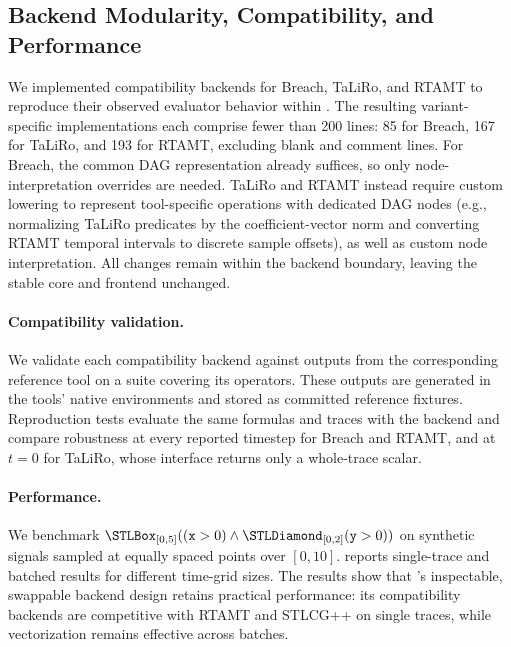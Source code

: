 \subsection{Backend Modularity, Compatibility, and Performance}
\label{sec:implement-variations}

We implemented compatibility backends for Breach, TaLiRo, and RTAMT to
reproduce their observed evaluator behavior within \tool.
The resulting variant-specific implementations each comprise fewer than 200
lines: 85 for Breach, 167 for TaLiRo, and 193 for RTAMT, excluding blank and
comment lines.
For Breach, the common DAG representation already suffices, so only
node-interpretation overrides are needed. TaLiRo and RTAMT instead require
custom lowering to represent tool-specific operations with dedicated DAG nodes
(e.g., normalizing TaLiRo predicates by the coefficient-vector norm and
converting RTAMT temporal intervals to discrete sample offsets), as well as
custom node interpretation. All changes remain within the backend boundary,
leaving the stable core and frontend unchanged.

\paragraph{Compatibility validation.}
We validate each compatibility backend against outputs from the corresponding
reference tool on a suite covering its operators. These outputs are generated
in the tools' native environments and stored as committed reference fixtures.
Reproduction tests evaluate the same formulas and traces with the backend and
compare robustness at every reported timestep for Breach and RTAMT, and at
$t=0$ for TaLiRo, whose interface returns only a whole-trace scalar.

\paragraph{Performance.}\label{sec:performance}
We benchmark
$\Always_{[0,5]}((\mathtt{x}>0)\wedge\Eventually_{[0,2]}(\mathtt{y}>0))$ on synthetic signals
sampled at equally spaced points over $[0,10]$.
 reports single-trace and batched results for
different time-grid sizes.
The results show that \tool's inspectable, swappable backend design retains
practical performance: its compatibility backends are competitive with RTAMT
and STLCG++ on single traces, while vectorization remains effective across
batches.



